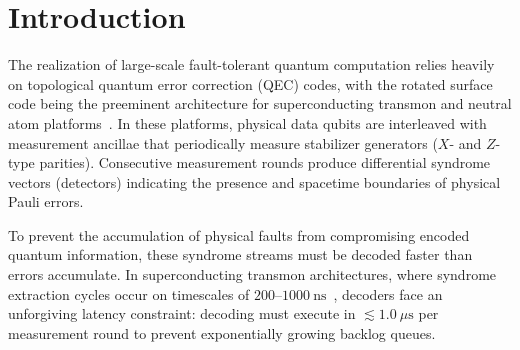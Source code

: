 \documentclass[aps,prxquantum,reprint,superscriptaddress,floatfix,nofootinbib]{revtex4-2}
\begin{document}
\begin{abstract}
iterative matching baselines (\textsc{recMWPM}/\textsc{IRMWPM}) which lack non-stationary telemetry tracking. Furthermore, under spatially correlated $2\times 2$ crosstalk bursts and two-qubit gate depolarization (Regime C), RL residual modulation demonstrates a statistically significant \textbf{14.1\% recovery gap} over pure analytical Bayesian priors ($p < 0.005$, paired $t$-test and Wilcoxon signed-rank test), proving the necessity of the RL layer. Pure algorithmic outer-loop updates execute in $110\ \mu\text{s}$ ($d=3$), $290\ \mu\text{s}$ ($d=5$), and $740\ \mu\text{s}$ ($d=7$), well within the physical millisecond-scale shot accumulation window, while double-buffered C++ weight updates swap active decoder references in $<10\ \text{ns}$. Finally, RL-MWPM boosts the global below-threshold error suppression factor to $\mathbf{\Lambda_{\text{global}} = \sqrt{\text{LER}_3/\text{LER}_7} = 7.36}$ (vs. Static $5.77$) and preserves strict physical error monotonicity on experimental transmon hardware drift replay. These results establish a scalable, hardware-native path toward resilient fault-tolerant quantum computation in fluctuating physical architectures.
\end{abstract}

\maketitle

\section{Introduction}
\label{sec:intro}

The realization of large-scale fault-tolerant quantum computation relies heavily on topological quantum error correction (QEC) codes, with the rotated surface code being the preeminent architecture for superconducting transmon and neutral atom platforms~\cite{fowler2012surface,dennis2002topological,acharya2023suppressing}. In these platforms, physical data qubits are interleaved with measurement ancillae that periodically measure stabilizer generators ($X$- and $Z$-type parities). Consecutive measurement rounds produce differential syndrome vectors (detectors) indicating the presence and spacetime boundaries of physical Pauli errors.

To prevent the accumulation of physical faults from compromising encoded quantum information, these syndrome streams must be decoded faster than errors accumulate. In superconducting transmon architectures, where syndrome extraction cycles occur on timescales of $200\text{--}1000\ \text{ns}$~\cite{acharya2023suppressing,google2024quantum}, decoders face an unforgiving latency constraint: decoding must execute in $\lesssim 1.0\ \mu\text{s}$ per measurement round to prevent exponentially growing backlog queues.
\end{document}

